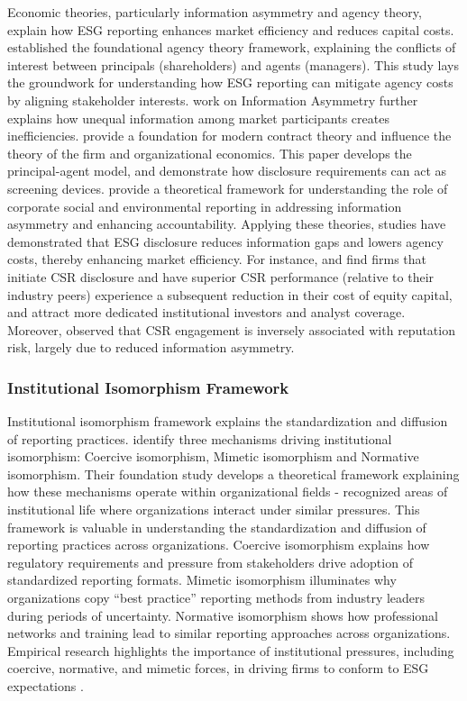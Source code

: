 \documentclass[
  authoryear]{elsarticle}
\begin{document}
Economic theories, particularly information asymmetry and agency theory,
explain how ESG reporting enhances market efficiency and reduces capital
costs. \citet{JENSEN1976} established the foundational agency theory
framework, explaining the conflicts of interest between principals
(shareholders) and agents (managers). This study lays the groundwork for
understanding how ESG reporting can mitigate agency costs by aligning
stakeholder interests. \citet{AKERLOF1970} work on Information Asymmetry
further explains how unequal information among market participants
creates inefficiencies. \citet{HART1987} provide a foundation for modern
contract theory and influence the theory of the firm and organizational
economics. This paper develops the principal-agent model, and
demonstrate how disclosure requirements can act as screening devices.
\citet{GRAY1996} provide a theoretical framework for understanding the
role of corporate social and environmental reporting in addressing
information asymmetry and enhancing accountability. Applying these
theories, studies have demonstrated that ESG disclosure reduces
information gaps and lowers agency costs, thereby enhancing market
efficiency. For instance, \citet{DHALIWAL2011} and \citet{ELGHOUL2011}
find firms that initiate CSR disclosure and have superior CSR
performance (relative to their industry peers) experience a subsequent
reduction in their cost of equity capital, and attract more dedicated
institutional investors and analyst coverage. Moreover, \citet{CUI2018}
observed that CSR engagement is inversely associated with reputation
risk, largely due to reduced information asymmetry.

\subsubsection{Institutional Isomorphism
Framework}\label{institutional-isomorphism-framework}

Institutional isomorphism framework explains the standardization and
diffusion of reporting practices. \citet{DIMAGGIO1983} identify three
mechanisms driving institutional isomorphism: Coercive isomorphism,
Mimetic isomorphism and Normative isomorphism. Their foundation study
develops a theoretical framework explaining how these mechanisms operate
within organizational fields - recognized areas of institutional life
where organizations interact under similar pressures. This framework is
valuable in understanding the standardization and diffusion of reporting
practices across organizations. Coercive isomorphism explains how
regulatory requirements and pressure from stakeholders drive adoption of
standardized reporting formats. Mimetic isomorphism illuminates why
organizations copy ``best practice'' reporting methods from industry
leaders during periods of uncertainty. Normative isomorphism shows how
professional networks and training lead to similar reporting approaches
across organizations. Empirical research highlights the importance of
institutional pressures, including coercive, normative, and mimetic
forces, in driving firms to conform to ESG expectations
\citep{DELMAS2004, HIGGINS2014, BEBBINGTON2018, CHRISTENSEN2021}.
\end{document}
